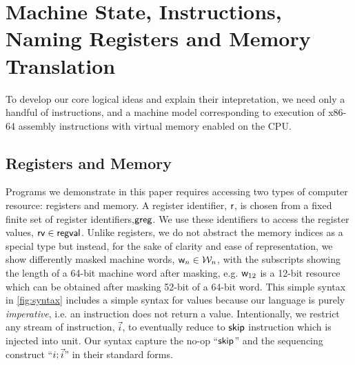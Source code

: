 \section{Machine State, Instructions, Naming Registers and Memory Translation}
\label{sec:syntax}
To develop our core logical ideas and explain their intepretation, we need only a handful of instructions, and a machine model corresponding to execution of x86-64 assembly instructions with virtual memory enabled on the CPU.

\subsection{Registers and Memory}
Programs we demonstrate in this paper requires accessing two types of computer resource: registers and memory. A register identifier, $\mathsf{r}$, is chosen from a fixed finite set of register identifiers,$\mathsf{greg}$. We use these identifiers to access the register values, $\mathsf{rv} \in \mathsf{regval}$. Unlike registers, we do not abstract the memory indices as a special type but instead, for the sake of clarity and ease of representation, we show differently masked machine words, $\mathsf{w}_n \in \mathcal{W}_n$, with the subscripts showing the length of a 64-bit machine word after masking, e.g. $\mathsf{w}_{12}$ is a 12-bit resource which can be obtained after masking 52-bit of a 64-bit word.
This simple syntax in \ref{fig:syntax} includes a simple syntax for values because our language is purely \textit{imperative}, i.e. an instruction does not return a value. Intentionally, we restrict any stream of instruction, $\vec{i}$, to eventually reduce to $\mathsf{skip}$ instruction which is injected into unit. Our syntax capture the no-op ``$\mathsf{skip}$'' and the sequencing construct ``$i; \vec{i}$'' in their standard forms.
%
